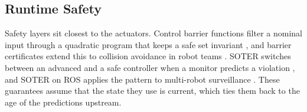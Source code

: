 \subsection{Runtime Safety}

Safety layers sit closest to the actuators.  Control barrier functions filter a
nominal input through a quadratic program that keeps a safe set invariant
\cite{ames2017cbf}, and barrier certificates extend this to collision avoidance
in robot teams \cite{wang2017barrier}.  SOTER switches between an advanced and a
safe controller when a monitor predicts a violation \cite{desai2019soter}, and
SOTER on ROS applies the pattern to multi-robot surveillance
\cite{shivakumar2020soterros}.  These guarantees assume that the state they use
is current, which ties them back to the age of the predictions upstream.
